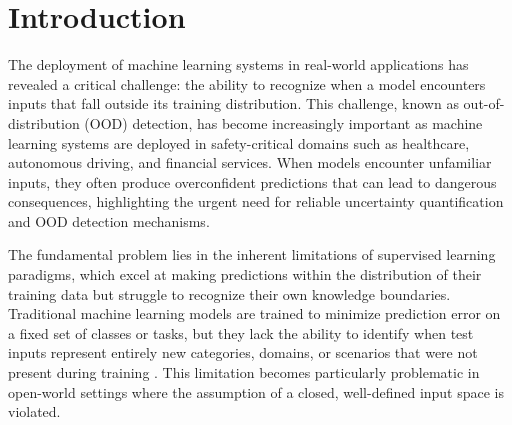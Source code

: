 \documentclass[11pt, oneside]{book}
\theoremstyle{plain}
\theoremstyle{definition}
\theoremstyle{remark}
\begin{document}



\makedeclaration
\makeapproval
\makecopyright






\tableofcontents
\listoffigures
\listoftables

\pagebreak
{}


\chapter{Introduction}

The deployment of machine learning systems in real-world applications has revealed a critical challenge: the ability to recognize when a model encounters inputs that fall outside its training distribution. This challenge, known as out-of-distribution (OOD) detection, has become increasingly important as machine learning systems are deployed in safety-critical domains such as healthcare, autonomous driving, and financial services. When models encounter unfamiliar inputs, they often produce overconfident predictions that can lead to dangerous consequences, highlighting the urgent need for reliable uncertainty quantification and OOD detection mechanisms.

The fundamental problem lies in the inherent limitations of supervised learning paradigms, which excel at making predictions within the distribution of their training data but struggle to recognize their own knowledge boundaries. Traditional machine learning models are trained to minimize prediction error on a fixed set of classes or tasks, but they lack the ability to identify when test inputs represent entirely new categories, domains, or scenarios that were not present during training \citep{hendrycks2016baseline}. This limitation becomes particularly problematic in open-world settings where the assumption of a closed, well-defined input space is violated.
\end{document}
